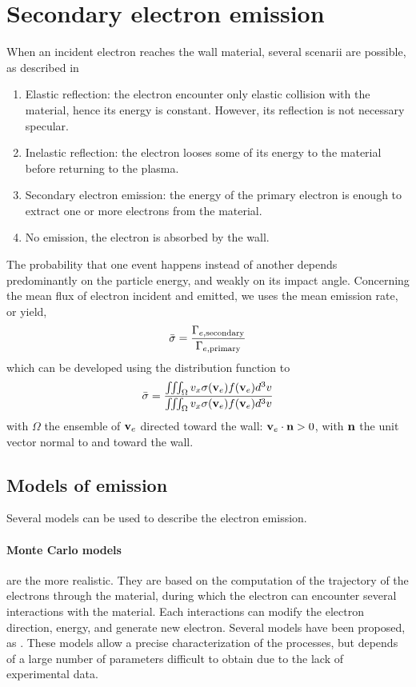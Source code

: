 
\section{Secondary electron emission}
\label{sec-seemodel}
When an incident electron reaches the wall material, several scenarii are possible, as described in \citet{villemant}
\begin{enumerate}
  \item Elastic reflection\string: the electron encounter only elastic collision with the material, hence its energy is constant. However, its reflection is not necessary specular.
  \item Inelastic reflection\string: the electron looses some of its energy to the material before returning to the plasma.
  \item Secondary electron emission\string: the energy of the primary electron is enough to extract one or more electrons from the material.
  \item No emission, the electron is absorbed by the wall.
\end{enumerate}

The probability \proba{}  that one event happens instead of another depends predominantly on the particle energy, and weakly on its  impact angle.
Concerning the mean flux of electron incident and emitted, we uses the mean emission rate, or yield, \rate
\begin{equation*} \label{eq-ratedifinition}
   \bar{\sigma } = \frac{\Gamma_{e, \rm secondary}}{\Gamma_{e, \rm primary}}
\end{equation*}
which can be developed using the distribution function to 
\begin{equation*} \label{eq-ratedifinition_evdf}
   \bar{\sigma } = \frac{\iiint_{\Omega} v_x \sigma ({\mathbf v_e}) f({\mathbf v_e}) d^3v}{\iiint_{\Omega} v_x \sigma ({\mathbf v_e}) f({\mathbf v_e}) d^3v}
\end{equation*}
with $\Omega$ the ensemble of ${\mathbf v_e}$ directed toward the wall\string: ${\mathbf v_e} \cdot {\mathbf n} > 0$, with ${\mathbf n} $ the unit vector normal to and toward the wall.

\subsection{Models of emission } \label{subsec-seemodels}
Several models can be used to describe the electron emission.

\paragraph{Monte Carlo models} are the more realistic.
 They are based on the computation of the trajectory of the electrons through the material, during which the electron can encounter several interactions with the material.
 Each interactions can modify the electron direction, energy, and generate new electron.
 Several models have been proposed, as \citet{furman2002,pierron2017}.
 These models allow a precise characterization of the processes, but depends of a large number of parameters difficult to obtain due to the lack of experimental data.
 
